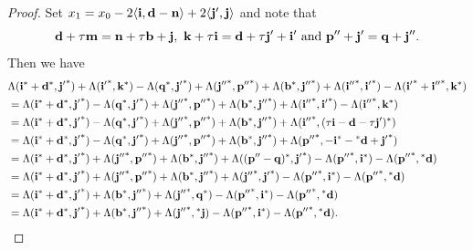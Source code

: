 \documentclass[reqno,12pt]{amsart}
\numberwithin{equation}{section}
\def\lr#1{\langle #1\rangle} \def\fin{\hfill$\square$}  \def\lra{\longrightarrow} \def\mod{\mbox{\rm \textbf{mod}}\,}\def\Mod{\mbox{\rm mod}\,}\def\top{\mbox{\rm top}\,}\def\soc{\mbox{\rm soc}\,}
\theoremstyle{plain} %
\theoremstyle{definition} %
\begin{document}
\begin{proof}
Set $x_1=x_0-2\lr{{\bf i},{\bf d}-{\bf n}}+2\lr{{\bf j}',{\bf j}}$ and note that
\[
{\bf d}+{\bf \tau m}={\bf n}+{\bf \tau b}+{\bf j},~{\bf k}+ \tau{\bf i}={\bf d}+\tau{\bf  j}'+{\bf i}'~\text{and}~{\bf p}''+{\bf j}'={\bf q}+{\bf j}''.
\]
Then we have
\begin{equation}\label{fduan}
\begin{split}
&\Lambda({\bf i}^\ast+{\bf d}^\ast,{{\bf j}'}^\ast)+{\Lambda({{\bf i}'}^\ast,{\bf k}^\ast)}-\Lambda({\bf q}^\ast,{{\bf j}'}^\ast)+\Lambda({{\bf j}''}^\ast,{{\bf p}''}^\ast)+\Lambda({\bf b}^\ast,{{\bf j}''}^\ast)+\Lambda({{\bf i}''}^\ast,{{\bf i}'}^\ast)-{\Lambda({{\bf i}'}^\ast+{{\bf i}''}^\ast,{\bf k}^\ast)}\\
&=\Lambda({\bf i}^\ast+{\bf d}^\ast,{{\bf j}'}^\ast)-\Lambda({\bf q}^\ast,{{\bf j}'}^\ast)+\Lambda({{\bf j}''}^\ast,{{\bf p}''}^\ast)+\Lambda({\bf b}^\ast,{{\bf j}''}^\ast)+{\Lambda({{\bf i}''}^\ast,{{\bf i}'}^\ast)}-{\Lambda({{\bf i}''}^\ast,{\bf k}^\ast)}\\
&=\Lambda({\bf i}^\ast+{\bf d}^\ast,{{\bf j}'}^\ast)-\Lambda({\bf q}^\ast,{{\bf j}'}^\ast)+\Lambda({{\bf j}''}^\ast,{{\bf p}''}^\ast)+\Lambda({\bf b}^\ast,{{\bf j}''}^\ast)+\Lambda({{\bf i}''}^\ast, (\tau{\bf i}-{\bf d}-\tau {{\bf j}'})^\ast)\\
&=\Lambda({\bf i}^\ast+{\bf d}^\ast,{{\bf j}'}^\ast)-{\Lambda({\bf q}^\ast,{{\bf j}'}^\ast)}+\Lambda({{\bf j}''}^\ast,{{\bf p}''}^\ast)+\Lambda({\bf b}^\ast,{{\bf j}''}^\ast)+{\Lambda({{\bf p}''}^\ast,-{\bf i}^\ast- {^\ast {\bf d}}+{{\bf j}'}^\ast)}\\
&=\Lambda({\bf i}^\ast+{\bf d}^\ast,{{\bf j}'}^\ast)+\Lambda({{\bf j}''}^\ast,{{\bf p}''}^\ast)+\Lambda({\bf b}^\ast,{{\bf j}''}^\ast)+{\Lambda(({\bf p}''-{\bf q})^\ast,{{\bf j}'}^\ast)}-\Lambda({{\bf p}''}^\ast,{\bf i}^\ast)-\Lambda({{\bf p}''}^\ast, {{^\ast {\bf d}}})\\
&=\Lambda({\bf i}^\ast+{\bf d}^\ast,{{\bf j}'}^\ast)+{\Lambda({{\bf j}''}^\ast,{{\bf p}''}^\ast)}+\Lambda({\bf b}^\ast,{{\bf j}''}^\ast)+ {\Lambda({{\bf j}''}^\ast,{{\bf j}'}^\ast)}-\Lambda({{\bf p}''}^\ast,{\bf i}^\ast)-\Lambda({{\bf p}''}^\ast, {^\ast {\bf d}})\\
&=\Lambda({\bf i}^\ast+{\bf d}^\ast,{{\bf j}'}^\ast)+{\Lambda({\bf b}^\ast,{{\bf j}''}^\ast)}+{\Lambda({{\bf j}''}^\ast,{\bf q}^\ast)}-\Lambda({{\bf p}''}^\ast,{\bf i}^\ast)-\Lambda({{\bf p}''}^\ast,{^\ast {\bf d}})\\
&=\Lambda({\bf i}^\ast+{\bf d}^\ast,{{\bf j}'}^\ast)+{\Lambda({\bf b}^\ast,{{\bf j}''}^\ast)}+{\Lambda({{\bf j}''}^\ast,{^\ast{\bf j}})}-\Lambda({{\bf p}''}^\ast,{\bf i}^\ast)-\Lambda({{\bf p}''}^\ast,{^\ast {\bf d}}).

\end{split}
\end{equation}
\end{proof}
\end{document}
